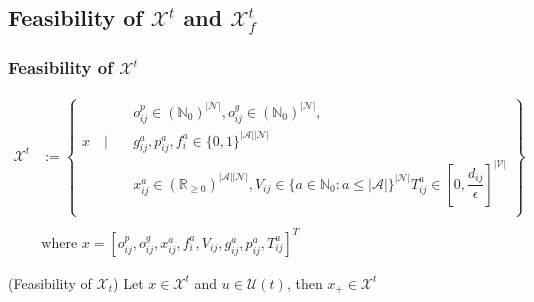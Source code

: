 \subsection{Feasibility of $\mathcal{X}^t$ and $\mathcal{X}^t_f$ }\label{appendix:feasibility_x_xf_time}

\subsubsection{Feasibility of $\mathcal{X}^t$}

\begin{equation}
	\begin{aligned}
		\mathcal{X}^t &:= \left\{
		\begin{aligned}
			&  o^p_{ij} \in (\mathbb{N}_0)^{|\mathcal{N}|}, o^g_{ij} \in (\mathbb{N}_0)^{|\mathcal{N}|},  \\
			x \quad  \Bigg| \quad&g^a_{ij}, p^a_{ij},f^a_{i} \in \{0,1\}^{|\mathcal{A}||\mathcal{N}|} \\%
			&  x_{ij}^a\in (\mathbb{R}_{\ge 0})^{|\mathcal{A}||\mathcal{N}|}, V_{ij} \in \{ a \in \mathbb{N}_0 : a \leq |\mathcal{A}| \}^{|\mathcal{N}|} T^a_{ij} \in [0, \dfrac{d_{ij}}{\epsilon}]^{|\mathcal{V}|}\\%
		\end{aligned}
		\right\}\\
		&\\
		&\text{where }  x = [o^p_{ij},o^g_{ij}, x_{ij}^a, f^a_{i}, V_{ij} , g^a_{ij}, p^a_{ij}, T^a_{ij}]^T
	\end{aligned}
\end{equation}


\begin{proposition}{(Feasibility of $\mathcal{X}_t$)}\label{appendix:pro:feas_x}
	Let $x \in \mathcal{X}^t$ and $u \in \mathcal{U}(t)$, then $x_+ \in \mathcal{X}^t$
\end{proposition}\\

